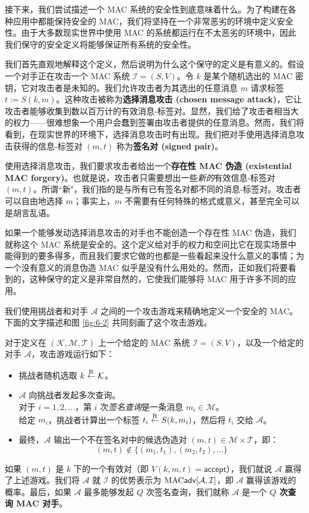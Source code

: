 \begin{snote}
接下来，我们尝试描述一个 MAC 系统的安全性到底意味着什么。为了构建在各种应用中都能保持安全的 MAC，我们将坚持在一个非常恶劣的环境中定义安全性。由于大多数现实世界中使用 MAC 的系统都运行在不太恶劣的环境中，因此我们保守的安全定义将能够保证所有系统的安全性。

我们首先直观地解释这个定义，然后说明为什么这个保守的定义是有意义的。假设一个对手正在攻击一个 MAC 系统 $\mathcal{I}=(S,V)$。令 $k$ 是某个随机选出的 MAC 密钥，它对攻击者是未知的。我们允许攻击者为其选出的任意消息 $m$ 请求标签 $t:=S(k,m)$。这种攻击被称为\textbf{选择消息攻击 (chosen message attack)}，它让攻击者能够收集到数以百万计的有效消息-标签对。显然，我们给了攻击者相当大的权力——很难想象一个用户会蠢到签署由攻击者提供的任意消息。然而，我们将看到，在现实世界的环境下，选择消息攻击时有出现。我们把对手使用选择消息攻击获得的信息-标签对 $(m,t)$ 称为\textbf{签名对 (signed pair)}。

使用选择消息攻击，我们要求攻击者给出一个\textbf{存在性 MAC 伪造 (existential MAC forgery)}。也就是说，攻击者只需要想出一些\emph{新的}有效信息-标签对 $(m,t)$。所谓``新"，我们指的是与所有已有签名对都不同的消息-标签对。攻击者可以自由地选择 $m$；事实上，$m$ 不需要有任何特殊的格式或意义，甚至完全可以是胡言乱语。

如果一个能够发动选择消息攻击的对手也不能创造一个存在性 MAC 伪造，我们就称这个 MAC 系统是安全的。这个定义给对手的权力和空间比它在现实场景中能得到的要多得多，而且我们要求它做的也都是一些看起来没什么意义的事情；为一个没有意义的消息伪造 MAC 似乎是没有什么用处的。然而，正如我们将要看到的，这种保守的定义是非常自然的，它使我们能够将 MAC 用于许多不同的应用。

我们使用挑战者和对手 $\mathcal{A}$ 之间的一个攻击游戏来精确地定义一个安全的 MAC。下面的文字描述和图 \ref{fig:6-2} 共同刻画了这个攻击游戏。
\end{snote}

\begin{game}\label{game:6-1}
对于定义在 $(\mathcal{K},\mathcal{M},\mathcal{T})$ 上一个给定的 MAC 系统 $\mathcal{I}=(S,V)$，以及一个给定的对手 $\mathcal{A}$，攻击游戏运行如下：
\begin{itemize}
	\item 挑战者随机选取 $k\overset{\rm R}\leftarrow\mathcal{K}$。
	\item $\mathcal{A}$ 向挑战者发起多次查询。\\
	对于 $i=1,2,\dots$，第 $i$ 次\emph{签名查询}是一条消息 $m_i\in\mathcal{M}$。\\
	给定 $m_i$，挑战者计算出一个标签 $t_i\overset{\rm R}\leftarrow S(k,m_i)$，然后将 $t_i$ 交给 $\mathcal{A}$。
	\item 最终，$\mathcal{A}$ 输出一个不在签名对中的候选伪造对 $(m,t)\in\mathcal{M}\times\mathcal{T}$，即：
	\[(m,t)\notin\{(m_1,t_1),(m_2,t_2),\dots\}\]
\end{itemize}
如果 $(m,t)$ 是 $k$ 下的一个有效对（即 $V(k,m,t)=\mathsf{accept}$），我们就说 $\mathcal{A}$ 赢得了上述游戏。我们将 $\mathcal{A}$ 就 $\mathcal{I}$ 的优势表示为 ${\rm MAC}\mathsf{adv}[\mathcal{A},\mathcal{I}]$，即 $\mathcal{A}$ 赢得该游戏的概率。最后，如果 $\mathcal{A}$ 最多能够发起 $Q$ 次签名查询，我们就称 $\mathcal{A}$ 是一个 \textbf{$Q$ 次查询 MAC 对手}。
\end{game}

